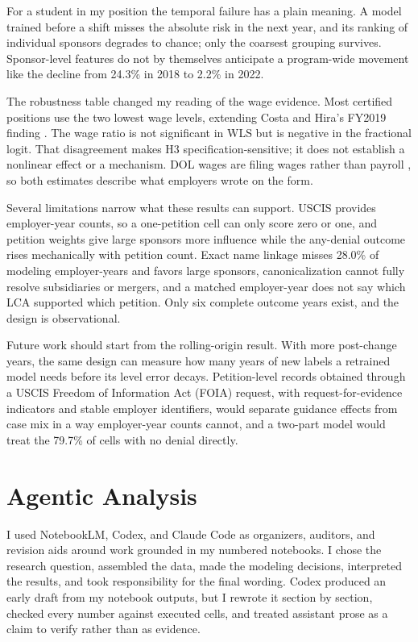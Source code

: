 \documentclass[9pt,twoside]{pnas-new}
\begin{document}
For a student in my position the temporal failure has a plain meaning. A model trained before a shift misses the absolute risk in the next year, and its ranking of individual sponsors degrades to chance; only the coarsest grouping survives. Sponsor-level features do not by themselves anticipate a program-wide movement like the decline from 24.3\% in 2018 to 2.2\% in 2022.

The robustness table changed my reading of the wage evidence. Most certified positions use the two lowest wage levels, extending Costa and Hira's FY2019 finding \cite{costahira2020}. The wage ratio is not significant in WLS but is negative in the fractional logit. That disagreement makes H3 specification-sensitive; it does not establish a nonlinear effect or a mechanism. DOL wages are filing wages rather than payroll \cite{bourveau2025}, so both estimates describe what employers wrote on the form.

Several limitations narrow what these results can support. USCIS provides employer-year counts, so a one-petition cell can only score zero or one, and petition weights give large sponsors more influence while the any-denial outcome rises mechanically with petition count. Exact name linkage misses 28.0\% of modeling employer-years and favors large sponsors, canonicalization cannot fully resolve subsidiaries or mergers, and a matched employer-year does not say which LCA supported which petition. Only six complete outcome years exist, and the design is observational.

Future work should start from the rolling-origin result. With more post-change years, the same design can measure how many years of new labels a retrained model needs before its level error decays. Petition-level records obtained through a USCIS Freedom of Information Act (FOIA) request, with request-for-evidence indicators and stable employer identifiers, would separate guidance effects from case mix in a way employer-year counts cannot, and a two-part model would treat the 79.7\% of cells with no denial directly.

\section*{Agentic Analysis}

I used NotebookLM, Codex, and Claude Code as organizers, auditors, and revision aids around work grounded in my numbered notebooks. I chose the research question, assembled the data, made the modeling decisions, interpreted the results, and took responsibility for the final wording. Codex produced an early draft from my notebook outputs, but I rewrote it section by section, checked every number against executed cells, and treated assistant prose as a claim to verify rather than as evidence.
\end{document}

